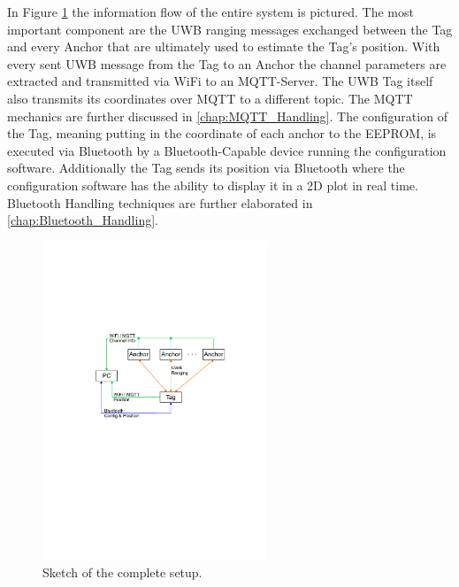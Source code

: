 In Figure \ref{fig:information_flow} the information flow of the entire system is pictured. 
The most important component are the UWB ranging messages exchanged between the Tag and every Anchor that are ultimately used to estimate the Tag's position. 
With every sent UWB message from the Tag to an Anchor the channel parameters are extracted and transmitted via WiFi to an MQTT-Server. 
The UWB Tag itself also transmits its coordinates over MQTT to a different topic. 
The MQTT mechanics are further discussed in \ref{chap:MQTT_Handling}. 
\vspace{4pt}
\newline
The configuration of the Tag, meaning putting in the coordinate of each anchor to the EEPROM, is executed via Bluetooth by a Bluetooth-Capable device running the configuration software. 
Additionally the Tag sends its position via Bluetooth where the configuration software has the ability to display it in a 2D plot in real time. 
Bluetooth Handling techniques are further elaborated in \ref{chap:Bluetooth_Handling}. 

\begin{figure}[!hbt]
	\centering
	\includegraphics[width=0.6\textwidth]{pictures/information_flow.pdf}
	\caption{Sketch of the complete setup.}
	\label{fig:information_flow}
\end{figure}












